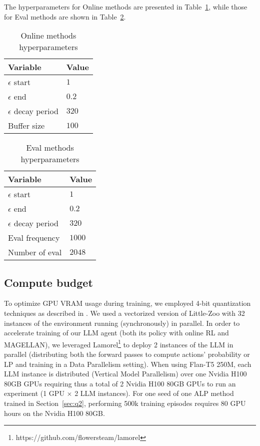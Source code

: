 The hyperparameters for Online methods are presented in Table~\ref{tab:online_param}, while those for Eval methods are shown in Table~\ref{tab:eval_param}.

\begin{table}[!ht]
    \caption{Online methods hyperparameters}
    \centering 
    \begin{tabular}{ll}
    \toprule
    \textbf{Variable} & \textbf{Value} \\
    \midrule
    $\epsilon$ start & $1$ \\
    $\epsilon$ end & $0.2$ \\
    $\epsilon$ decay period & $320$ \\
    Buffer size & $100$ \\
    \bottomrule
    \end{tabular}
    \label{tab:online_param}
\end{table}


\begin{table}[!ht]
    \caption{Eval methods hyperparameters}
    \centering 
    \begin{tabular}{ll}
    \toprule
    \textbf{Variable} & \textbf{Value} \\
    \midrule
    $\epsilon$ start & $1$ \\
    $\epsilon$ end & $0.2$ \\
    $\epsilon$ decay period & $320$ \\
    Eval frequency & $1000$ \\
    Number of eval & $2048$ \\
    \bottomrule
    \end{tabular}
    \label{tab:eval_param}
\end{table}


\subsection{Compute budget}
\label{app:compute_budget}
To optimize GPU VRAM usage during training, we employed 4-bit quantization techniques as described in \citep{Dettmers2023QLoRAEF}. We used a vectorized version of Little-Zoo with 32 instances of the environment running (synchronously) in parallel. In order to accelerate training of our LLM agent  (both its policy with online RL and MAGELLAN), we leveraged Lamorel\footnote{https://github.com/flowersteam/lamorel} to deploy 2 instances of the LLM in parallel (distributing both the forward passes to compute actions' probability or LP and training in a Data Parallelism setting). When using Flan-T5 250M, each LLM instance is distributed (Vertical Model Parallelism) over one Nvidia H100 80GB GPUs requiring thus a total of 2 Nvidia H100 80GB GPUs to run an experiment (1 GPU $\times$ 2 LLM instances). For one seed of one ALP method trained in Section~\ref{sec:q2}, performing 500k training episodes requires 80 GPU hours on the Nvidia H100 80GB.


